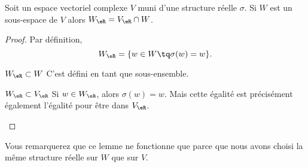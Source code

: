 \begin{lemma}
    Soit un espace vectoriel complexe \( V\) muni d'une structure réelle \( \sigma\). Si \( W\) est un sous-espace de \( V\) alors \( W_{\eR}=V_{\eR}\cap W\).
\end{lemma}

\begin{proof}
    Par définition,
    \begin{equation}
        W_{\eR}=\{ w\in W\tq \sigma(w)=w \}.
    \end{equation}
    \begin{subproof}
    \item[\( W_{\eR}\subset W\)]
           C'est défini en tant que sous-ensemble.
       \item[\( W_{\eR}\subset V_{\eR}\)]
           Si \( w\in W_\eR\), alors \( \sigma(w)=w\). Mais cette égalité est précisément également l'égalité pour être dans \( V_{\eR}\).
    \end{subproof}
\end{proof}
 
Vous remarquerez que ce lemme ne fonctionne que parce que nous avons choisi la même structure réelle sur \( W\) que sur \( V\).
